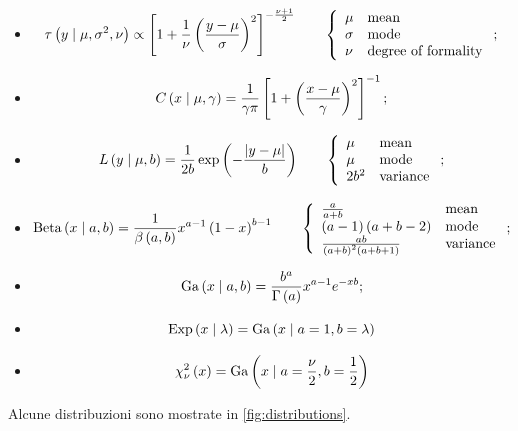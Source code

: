 \documentclass[10pt]{article}
\DeclareMathOperator{\Beta}{Beta}
\DeclareMathOperator{\Ga}{Ga}
\DeclareMathOperator{\Exp}{Exp}
\newcommand{\pare}[1]{
	\ensuremath{\left(#1\right)}
}
\newcommand{\spare}[1]{
	\ensuremath{\left[#1\right]}
}
\begin{document}
\begin{itemize}
\item {} \begin{equation}
\tau\pare{y\cond\mu, \sigma^2, \nu} \propto \spare{1 + \frac{1}{\nu}\pare{\frac{y-\mu}{\sigma}}^2}^{-\frac{\nu+1}{2}}
\qquad\left\{\begin{array}{ll}
\mu & \text{mean} \\
\sigma & \text{mode} \\
\nu & \text{degree of formality} \\
\end{array}\right.;
\end{equation}
\item {} \begin{equation}
C\pare{x\cond\mu, \gamma} = \frac{1}{\gamma\pi}\spare{1 + \pare{\frac{x-\mu}{\gamma}}^2}^{-1};
\end{equation}
\item {} \begin{equation}
L\pare{y\cond\mu, b} = \frac{1}{2b}\exp\pare{-\frac{\left|y-\mu\right|}{b}}
\qquad\left\{\begin{array}{ll}
\mu & \text{mean} \\
\mu & \text{mode} \\
2b^2 & \text{variance} \\
\end{array}\right.;
\end{equation}
\item {} \begin{equation}
\Beta\pare{x\cond a, b} = \frac{1}{\beta\pare{a, b}}x^{a-1}\pare{1-x}^{b-1}
\qquad\left\{\begin{array}{ll}
\frac{a}{a+b} & \text{mean} \\
\pare{a-1}\pare{a+b-2} & \text{mode} \\
\frac{ab}{\pare{a+b}^2\pare{a+b+1}} & \text{variance} \\
\end{array}\right.;
\end{equation}
\item {} \begin{equation}
\Ga\pare{x\cond a, b} = \frac{b^a}{\Gamma\pare{a}}x^{a-1}e^{-xb};
\end{equation}
\item {} \begin{equation}
\Exp\pare{x\cond\lambda} = \Ga\pare{x\cond a=1, b=\lambda}
\end{equation}
\item {} \begin{equation}
\chi^2_\nu\pare{x} = \Ga\pare{x\cond a=\frac{\nu}{2}, b=\frac{1}{2}}
\end{equation}
\end{itemize}
Alcune distribuzioni sono mostrate in \cref{fig:distributions}.
\end{document}
